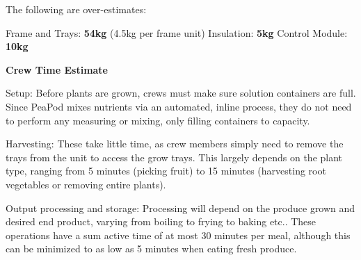 \documentclass{report}
\begin{document}
The following are over-estimates:

Frame and Trays: \textbf{54kg} (4.5kg per frame unit)
Insulation: \textbf{5kg}
Control Module: \textbf{10kg}

\textbf{Crew Time Estimate}

Setup: Before plants are grown, crews must make sure solution containers are full. Since PeaPod mixes nutrients via an automated, inline process, they do not need to perform any measuring or mixing, only filling containers to capacity. 

Harvesting: These take little time, as crew members simply need to remove the trays from the unit to access the grow trays. This largely depends on the plant type, ranging from 5 minutes (picking fruit) to 15 minutes (harvesting root vegetables or removing entire plants).

Output processing and storage: Processing will depend on the produce grown and desired end product, varying from boiling to frying to baking etc.. These operations have a sum active time of at most 30 minutes per meal, although this can be minimized to as low as 5 minutes when eating fresh produce.

\newpage



\end{document}
